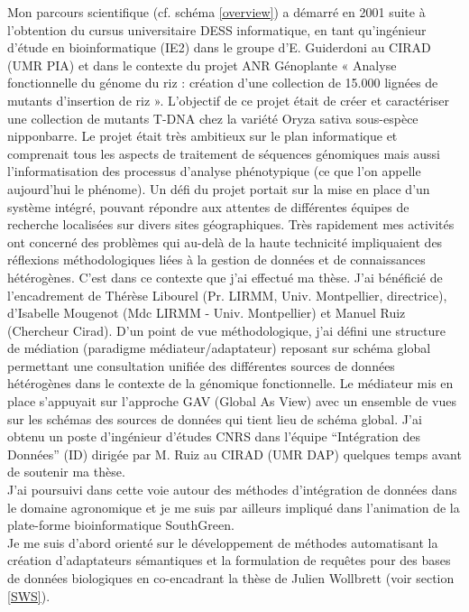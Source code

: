 Mon parcours scientifique (cf. schéma \ref{overview}) a démarré en 2001 suite à l'obtention du cursus universitaire DESS informatique, en tant qu’ingénieur d’étude en bioinformatique (IE2) dans le groupe d’E. Guiderdoni au CIRAD (UMR PIA) et dans le contexte du projet ANR Génoplante « Analyse fonctionnelle du génome du riz : création d'une collection de 15.000 lignées de mutants d'insertion de riz ».  L'objectif de ce projet était de créer et caractériser une collection de mutants T-DNA chez la variété Oryza sativa sous-espèce nipponbarre. Le projet était très ambitieux sur le plan informatique et comprenait tous les aspects de traitement de séquences génomiques mais aussi l’informatisation des processus d’analyse phénotypique (ce que l’on appelle aujourd’hui le phénome). Un défi du projet portait sur la mise en place d’un système intégré, pouvant répondre aux attentes de différentes  équipes de recherche localisées sur divers sites géographiques. Très rapidement mes activités ont concerné des problèmes qui au-delà de la haute technicité impliquaient des réflexions méthodologiques liées à la gestion de données et de connaissances hétérogènes. C’est dans ce contexte que j’ai effectué ma thèse. J’ai bénéficié de l’encadrement  de Thérèse Libourel (Pr. LIRMM, Univ. Montpellier, directrice), d’Isabelle Mougenot (Mdc LIRMM - Univ. Montpellier) et Manuel Ruiz (Chercheur Cirad). D’un point de vue méthodologique, j’ai défini une structure de médiation (paradigme médiateur/adaptateur) reposant sur schéma global permettant  une consultation unifiée des différentes sources de données hétérogènes dans le contexte de la génomique fonctionnelle. Le médiateur mis en place s’appuyait sur l’approche GAV (Global As View) avec un ensemble de vues sur les schémas des sources de données qui tient lieu de schéma global. J’ai obtenu un poste d’ingénieur d’études CNRS dans l’équipe “Intégration des Données” (ID) dirigée par M. Ruiz au CIRAD (UMR DAP) quelques temps avant de soutenir ma thèse. \\

J’ai poursuivi dans cette voie autour des méthodes d’intégration de données dans le domaine agronomique et je me suis par ailleurs impliqué dans l’animation de la plate-forme bioinformatique SouthGreen.  \\
Je me suis d’abord orienté sur le développement de méthodes automatisant la création d’adaptateurs sémantiques et la formulation de requêtes pour des bases de données biologiques en co-encadrant la thèse de Julien Wollbrett (voir section \ref{SWS}).\\

